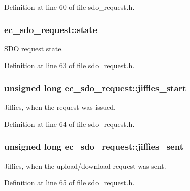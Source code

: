 \-Definition at line 60 of file sdo\-\_\-request.\-h.

\subsubsection[{state}]{ {\bf ec\-\_\-sdo\-\_\-request\-::state}}\label{structec__sdo__request_a0c50e10b80720d00f11863e76ecc1755}


\-S\-D\-O request state. 



\-Definition at line 63 of file sdo\-\_\-request.\-h.

\subsubsection[{jiffies\-\_\-start}]{\setlength{\rightskip}{0pt plus 5cm}unsigned long {\bf ec\-\_\-sdo\-\_\-request\-::jiffies\-\_\-start}}\label{structec__sdo__request_aa5be223c362a630833451bd57471a05f}


\-Jiffies, when the request was issued. 



\-Definition at line 64 of file sdo\-\_\-request.\-h.

\subsubsection[{jiffies\-\_\-sent}]{\setlength{\rightskip}{0pt plus 5cm}unsigned long {\bf ec\-\_\-sdo\-\_\-request\-::jiffies\-\_\-sent}}\label{structec__sdo__request_ad5d35e78085bce7e20a02753024e5822}


\-Jiffies, when the upload/download request was sent. 



\-Definition at line 65 of file sdo\-\_\-request.\-h.

